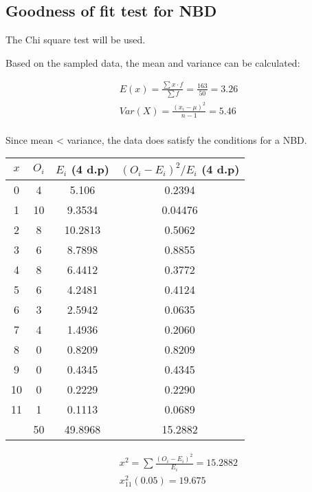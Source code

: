 \documentclass{article}
\begin{document}
\subsection{Goodness of fit test for NBD}
The Chi square test will be used.

Based on the sampled data, the mean and variance can be calculated:

\begin{gather*}
  E(x) = \frac{\sum x \cdot f}{\sum f} = \frac{163}{50} = 3.26 \\[5pt]
  Var(X) = \frac{(x_i - \mu)^2}{n - 1} = 5.46 \\[5pt]
\end{gather*}

Since mean < variance, the data does satisfy the conditions for
a NBD. \\

\begin{center}
  \begin{tabular}{|c|c|c|c|}
    \hline
    $x$ & $O_i$ & $ E_i $ (4 d.p) & $ (O_i - E_i)^2 / E_i $ (4 d.p) \\
    \hline 
    \hline 
    0  & 4  & 5.106   & 0.2394 \\
    1  & 10 & 9.3534  & 0.04476 \\
    2  & 8  & 10.2813 & 0.5062 \\
    3  & 6  & 8.7898  & 0.8855 \\
    4  & 8  & 6.4412  & 0.3772 \\
    5  & 6  & 4.2481  & 0.4124 \\
    6  & 3  & 2.5942  & 0.0635 \\
    7  & 4  & 1.4936  & 0.2060 \\
    8  & 0  & 0.8209  & 0.8209 \\
    9  & 0  & 0.4345  & 0.4345 \\
    10 & 0  & 0.2229  & 0.2290 \\
    11 & 1  & 0.1113  & 0.0689 \\
    \hline
    \hline
       & 50 & 49.8968 & 15.2882  \\
    \hline
  \end{tabular}
\end{center}

\begin{gather*}
  x^2 = \sum \frac{(O_i - E_i)^2}{E_i} = 15.2882 \\[5pt]
  x^2_{11} (0.05) = 19.675 \\[5pt]
\end{gather*}
\end{document}
